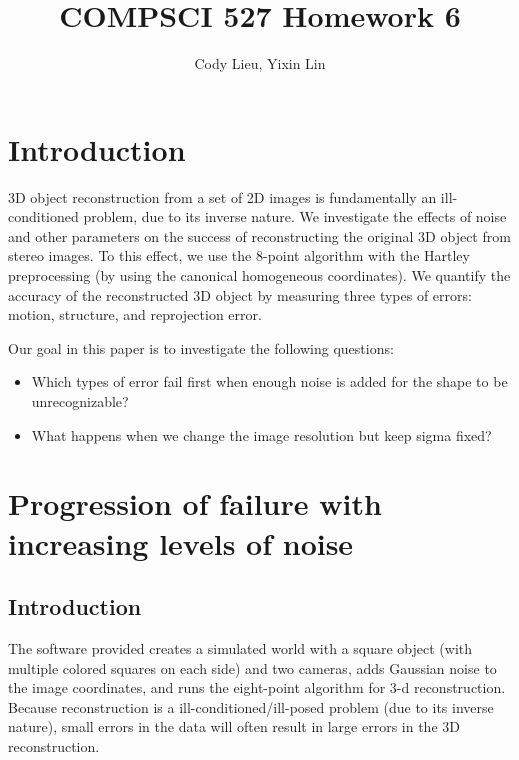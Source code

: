 \documentclass{article}
\author{Cody Lieu, Yixin Lin}
\title{COMPSCI 527 Homework 6}
\begin{document}
\maketitle

% 


\section{Introduction}

3D object reconstruction from a set of 2D images is fundamentally an ill-conditioned problem, due to its inverse nature. We investigate the effects of noise and other parameters on the success of reconstructing the original 3D object from stereo images. To this effect, we use the 8-point algorithm with the Hartley preprocessing\cite{hartley} (by using the canonical homogeneous coordinates). We quantify the accuracy of the reconstructed 3D object by measuring three types of errors: motion, structure, and reprojection error.

Our goal in this paper is to investigate the following questions:
\begin{itemize}
\item Which types of error fail first when enough noise is added for the shape to be unrecognizable? 
\item What happens when we change the image resolution but keep sigma fixed?
\end{itemize}

\section{Progression of failure with increasing levels of noise}

\subsection{Introduction}

The software provided creates a simulated world with a square object (with multiple colored squares on each side) and two cameras, adds Gaussian noise to the image coordinates, and runs the eight-point algorithm for 3-d reconstruction. Because reconstruction is a ill-conditioned/ill-posed problem (due to its inverse nature), small errors in the data will often result in large errors in the 3D reconstruction. 
\end{document}
